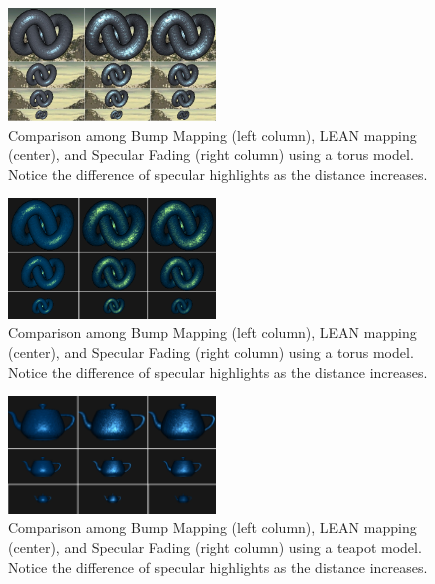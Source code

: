 \documentclass[10pt, conference]{IEEEtran}
\begin{document}
\begin{figure}[here]
\includegraphics[width=0.49\textwidth]{figs/BLS3.png}
\caption{Comparison among Bump Mapping (left column), LEAN mapping (center), and Specular Fading (right column) using a torus model. Notice the difference of specular highlights as the distance increases.}
\label{fig:BLS3}
\end{figure}

\begin{figure}[here]
\includegraphics[width=0.49\textwidth]{figs/BLS4.png}
\caption{Comparison among Bump Mapping (left column), LEAN mapping (center), and Specular Fading (right column) using a torus model. Notice the difference of specular highlights as the distance increases.}
\label{fig:BLS4}
\end{figure}

\begin{figure}[here]
\includegraphics[width=0.49\textwidth]{figs/BLS5.png}
\caption{Comparison among Bump Mapping (left column), LEAN mapping (center), and Specular Fading (right column) using a teapot model. Notice the difference of specular highlights as the distance increases.}
\label{fig:BLS5}
\end{figure}
\end{document}
